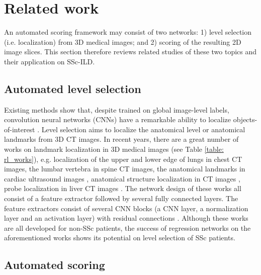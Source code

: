 \section{Related work}

An automated scoring framework may consist of two networks: 1) level selection (i.e. localization) from 3D medical images; and 2) scoring of the resulting 2D image slices. This section therefore reviews related studies of these two topics and their application on SSc-ILD.

\subsection{Automated level selection}

Existing methods show that, despite trained on global image-level labels, convolution neural networks (CNNs) have a remarkable ability to localize objects-of-interest \cite{wei2020slir}.  Level selection aims to localize the anatomical level or anatomical landmarks \cite{Assayag2012, Goh2008} from 3D CT images. In recent years, there are a great number of works on landmark localization in 3D medical images (see Table \ref{table: rl_works}), e.g. localization of the upper and lower edge of lungs \cite{proskurov2021fast} in chest CT images, the lumbar vertebra \cite{chen2015automatic, Belharbi2017, cheng2021automatic} in spine CT images, the anatomical landmarks in cardiac ultrasound images \cite{jafari2019automatic}, anatomical structure localization in CT images \cite{de2017convnet, humpire2018efficient},  probe  localization in liver CT images \cite{wei2020slir}. The network design of these works all consist of a feature extractor followed by several fully connected layers. The feature extractors consist of several CNN blocks (a CNN layer, a normalization layer and an activation layer) with residual connections \cite{cheng2021automatic}. Although these works are all developed for non-SSc patients, the success of regression networks on the aforementioned works shows its potential on level selection of SSc patients.

\subsection{Automated scoring}

